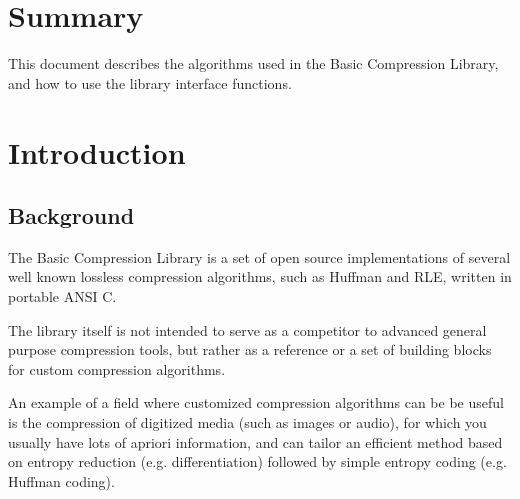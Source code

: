 \documentclass[a4paper,11pt,oneside]{report}
\begin{document}
\pagestyle{plain}

\bclmaketitle

\setcounter{page}{1}


\chapter*{Summary}

This document describes the algorithms used in the Basic Compression Library,
and how to use the library interface functions.


\tableofcontents


\newpage
{}
\setcounter{page}{1}

\pagestyle{fancy}


\chapter{Introduction}
\thispagestyle{fancy}

\section{Background}
The Basic Compression Library is a set of open source implementations of
several well known lossless compression algorithms, such as Huffman and
RLE, written in portable ANSI C.

The library itself is not intended to serve as a competitor to advanced
general purpose compression tools, but rather as a reference or a set of
building blocks for custom compression algorithms.

An example of a field where customized compression algorithms can be be
useful is the compression of digitized media (such as images or audio),
for which you usually have lots of apriori information, and can tailor
an efficient method based on entropy reduction (e.g. differentiation)
followed by simple entropy coding (e.g. Huffman coding).
\end{document}
